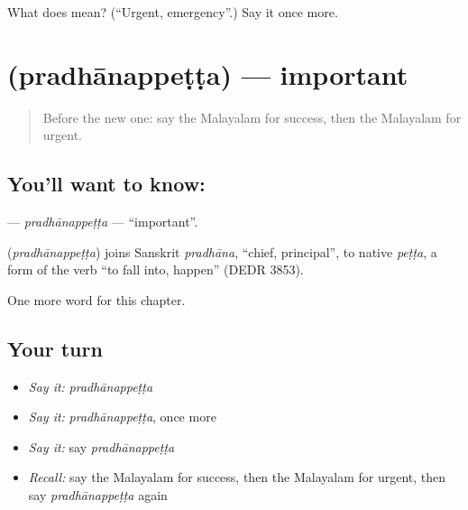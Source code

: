 \begin{tcolorbox}[breakable,colback=teal!4,colframe=teal!35!black,title={Before you move on}]
What does  mean? (\textquotedblleft{}Urgent, emergency\textquotedblright{}.) Say it once more.
\end{tcolorbox}
\section[\texorpdfstring{\ml{പ്രധാനപ്പെട്ട} (pradhānappeṭṭa)}{പ്രധാനപ്പെട്ട (pradhānappeṭṭa)}]{ (pradhānappeṭṭa) — important}

\label{lesson:ML-C283-pradhanappetta}



\begin{quote}
Before the new one: say the Malayalam for success, then the Malayalam for urgent.
\end{quote}

\subsection*{You'll want to know: }
\textbf{} — \emph{pradhānappeṭṭa} — \textquotedblleft{}important\textquotedblright{}.

\begin{cousinweb}
\textbf{} (\emph{pradhānappeṭṭa}) joins Sanskrit \emph{pradhāna}, \textquotedblleft{}chief, principal\textquotedblright{}, to native \emph{peṭṭa}, a form of the verb \textquotedblleft{}to fall into, happen\textquotedblright{} (DEDR 3853).
\end{cousinweb}

\begin{grammarlens}[title={What you've built}]
One more word for this chapter.
\end{grammarlens}

\subsection*{Your turn}
\begin{itemize}
\raggedright
  \item \emph{Say it:} \emph{pradhānappeṭṭa}
  \item \emph{Say it:} \emph{pradhānappeṭṭa}, once more
  \item \emph{Say it:} say \emph{pradhānappeṭṭa}
  \item \emph{Recall:} say the Malayalam for success, then the Malayalam for urgent, then say \emph{pradhānappeṭṭa} again
\end{itemize}

